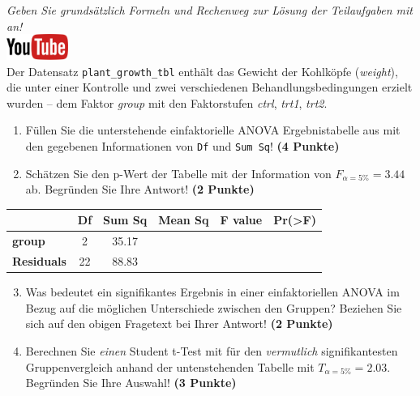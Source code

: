 \documentclass[a4paper, 9pt]{scrartcl}\usepackage[]{graphicx}\usepackage[]{xcolor}
\begin{document}
\textit{Geben Sie grunds{\"a}tzlich Formeln und Rechenweg zur L{\"o}sung der
  Teilaufgaben mit an!} \\[1Ex]

\hfill\href{https://youtu.be/49hvImMwVyE}{\includegraphics[width =
  2cm]{img/youtube}}\\[1Ex]


Der Datensatz \texttt{plant\_growth\_tbl} enth{\"a}lt das Gewicht der Kohlk{\"o}pfe
(\textit{weight}), die unter einer Kontrolle und zwei verschiedenen
Behandlungsbedingungen erzielt wurden -- dem Faktor \textit{group} mit den
Faktorstufen \textit{ctrl}, \textit{trt1}, \textit{trt2}.



\begin{enumerate}
\item F{\"u}llen Sie die unterstehende einfaktorielle ANOVA Ergebnistabelle aus
  mit den gegebenen Informationen von \texttt{Df} und \texttt{Sum Sq}!
  \textbf{(4 Punkte)}
\item Sch{\"a}tzen Sie den p-Wert der Tabelle mit der Information von
  $F_{\alpha = 5\%} = 3.44$ ab. Begr{\"u}nden Sie Ihre
  Antwort! \textbf{(2 Punkte)}
\end{enumerate}

\vspace{1Ex}

\begin{center}
  \Large
  \begin{tabular}{l|c|c|c|c|c}
     & \textbf{Df} & \textbf{Sum Sq} & \textbf{Mean Sq} & \textbf{F value} & \textbf{Pr(>F)} \strut\\
    \hline
   \textbf{group}  & 2 & 35.17 &  &  &  \strut\\
    \hline
   \textbf{Residuals}  & 22 & 88.83 &  &  &  \strut\\
  \end{tabular}
\end{center}

\vspace{1Ex}

\begin{enumerate}
  \setcounter{enumi}{2}
\item Was bedeutet ein signifikantes Ergebnis in einer einfaktoriellen
  ANOVA im Bezug auf die m{\"o}glichen Unterschiede zwischen den Gruppen? Beziehen Sie sich auf den obigen Fragetext bei Ihrer Antwort!
  \textbf{(2 Punkte)}
\item Berechnen Sie \textit{einen} Student t-Test mit f{\"u}r den \textit{vermutlich}
  signifikantesten Gruppenvergleich anhand der untenstehenden Tabelle mit
  $T_{\alpha = 5\%} = 2.03$. Begr{\"u}nden Sie Ihre Auswahl! \textbf{(3 Punkte)}
\end{enumerate}
\end{document}

